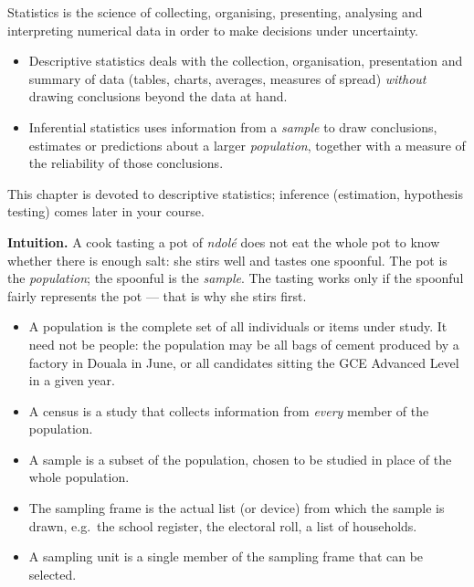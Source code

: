 \documentclass[11pt]{article}
\newcommand{\cle}[1]{{\popxbold\color{popdark}#1}}
\newcounter{popsec}
\newcounter{popsub}
\newcommand{\courssub}[1]{%
  \stepcounter{popsub}%
  \par\vspace{9pt}\noindent{\popxbold\fontsize{11.5}{13}\selectfont\color{popink}{\color{poporange}\thepopsec.\thepopsub}\hspace{6pt}#1}\par\nopagebreak\vspace{4pt}
}
\begin{document}
\begin{definition}
\cle{Statistics} is the science of collecting, organising, presenting, analysing and interpreting numerical data in order to make decisions under uncertainty.
\begin{itemize}
\item \cle{Descriptive statistics} deals with the collection, organisation, presentation and summary of data (tables, charts, averages, measures of spread) \emph{without} drawing conclusions beyond the data at hand.
\item \cle{Inferential statistics} uses information from a \emph{sample} to draw conclusions, estimates or predictions about a larger \emph{population}, together with a measure of the reliability of those conclusions.
\end{itemize}
\end{definition}

This chapter is devoted to descriptive statistics; inference (estimation, hypothesis testing) comes later in your course.

\courssub{Population, Census and Sample}

\textbf{Intuition.} A cook tasting a pot of \emph{ndolé} does not eat the whole pot to know whether there is enough salt: she stirs well and tastes one spoonful. The pot is the \emph{population}; the spoonful is the \emph{sample}. The tasting works only if the spoonful fairly represents the pot — that is why she stirs first.

\begin{definition}
\begin{itemize}
\item A \cle{population} is the complete set of all individuals or items under study. It need not be people: the population may be all bags of cement produced by a factory in Douala in June, or all candidates sitting the GCE Advanced Level in a given year.
\item A \cle{census} is a study that collects information from \emph{every} member of the population.
\item A \cle{sample} is a subset of the population, chosen to be studied in place of the whole population.
\item The \cle{sampling frame} is the actual list (or device) from which the sample is drawn, e.g.\ the school register, the electoral roll, a list of households.
\item A \cle{sampling unit} is a single member of the sampling frame that can be selected.
\end{itemize}
\end{definition}
\end{document}
